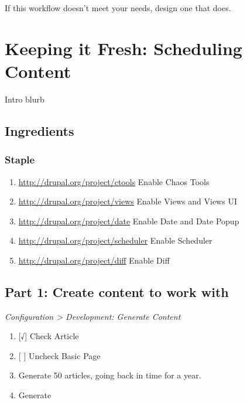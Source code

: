 \documentclass[letterpaper,10pt,english]{sphinxmanual}
\begin{document}
If this workflow doesn't meet your needs, design one that does.


\chapter{Keeping it Fresh: Scheduling Content}
\label{schedule:keeping-it-fresh-scheduling-content}\label{schedule::doc}
Intro blurb


\section{Ingredients}
\label{schedule:ingredients}

\subsection{Staple}
\label{schedule:staple}\begin{enumerate}
\item {} 
\href{http://drupal.org/project/ctools}{http://drupal.org/project/ctools} Enable Chaos Tools

\item {} 
\href{http://drupal.org/project/views}{http://drupal.org/project/views} Enable Views and Views UI

\item {} 
\href{http://drupal.org/project/date}{http://drupal.org/project/date} Enable Date and Date Popup

\item {} 
\href{http://drupal.org/project/scheduler}{http://drupal.org/project/scheduler} Enable Scheduler

\item {} 
\href{http://drupal.org/project/diff}{http://drupal.org/project/diff} Enable Diff

\end{enumerate}


\section{Part 1: Create content to work with}
\label{schedule:part-1-create-content-to-work-with}
\emph{Configuration \textgreater{} Development: Generate Content}
\begin{enumerate}
\item {} 
{[}√{]} Check Article

\item {} 
{[} {]} Uncheck Basic Page

\item {} 
Generate 50 articles, going back in time for a year.

\item {} 
Generate

\end{enumerate}
\end{document}
